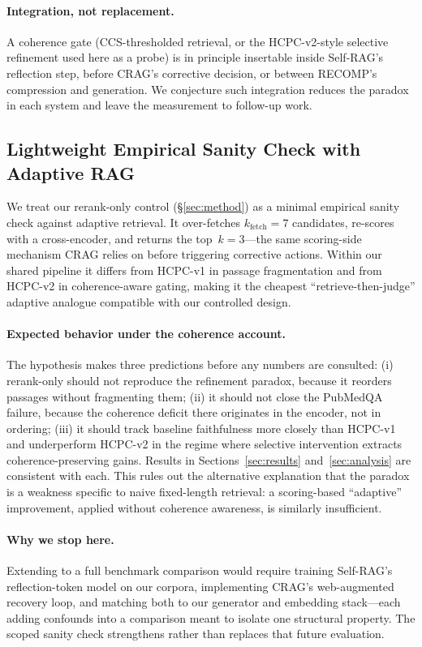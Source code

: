\paragraph{Integration, not replacement.}
A coherence gate (CCS-thresholded retrieval, or the HCPC-v2-style
selective refinement used here as a probe) is in principle insertable
inside Self-RAG's reflection step, before CRAG's corrective decision, or
between RECOMP's compression and generation. We conjecture such
integration reduces the paradox in each system and leave the measurement
to follow-up work.

\subsection{Lightweight Empirical Sanity Check with Adaptive RAG}
\label{sec:sanity_check}

We treat our rerank-only control (\S\ref{sec:method}) as a minimal
empirical sanity check against adaptive retrieval. It over-fetches
$k_{\text{fetch}}{=}7$ candidates, re-scores with a cross-encoder, and
returns the top~$k{=}3$---the same scoring-side mechanism CRAG relies on
before triggering corrective actions. Within our shared pipeline it
differs from HCPC-v1 in passage fragmentation and from HCPC-v2 in
coherence-aware gating, making it the cheapest ``retrieve-then-judge''
adaptive analogue compatible with our controlled design.

\paragraph{Expected behavior under the coherence account.}
The hypothesis makes three predictions before any numbers are consulted:
(i) rerank-only should not reproduce the refinement paradox, because it
reorders passages without fragmenting them; (ii) it should not close the
PubMedQA failure, because the coherence deficit there originates in the
encoder, not in ordering; (iii) it should track baseline faithfulness
more closely than HCPC-v1 and underperform HCPC-v2 in the regime where
selective intervention extracts coherence-preserving gains. Results in
Sections~\ref{sec:results} and~\ref{sec:analysis} are consistent with
each. This rules out the alternative explanation that the paradox is a
weakness specific to naive fixed-length retrieval: a scoring-based
``adaptive'' improvement, applied without coherence awareness, is
similarly insufficient.

\paragraph{Why we stop here.}
Extending to a full benchmark comparison would require training
Self-RAG's reflection-token model on our corpora, implementing CRAG's
web-augmented recovery loop, and matching both to our generator and
embedding stack---each adding confounds into a comparison meant to
isolate one structural property. The scoped sanity check strengthens
rather than replaces that future evaluation.

